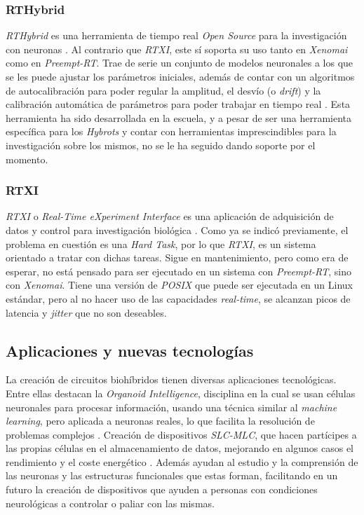 \subsubsection{RTHybrid\label{SSS:RTHYBRID}}


\textit{RTHybrid} es una herramienta de tiempo real \textit{Open Source} para la investigación con neuronas \cite{Amaducci2019}. Al contrario que \textit{RTXI}, este sí soporta su uso tanto en \textit{Xenomai} como en \textit{Preempt-RT}. Trae de serie un conjunto de modelos neuronales a los que se les puede ajustar los parámetros iniciales, además de contar con un algoritmos de autocalibración para poder regular la amplitud, el desvío (o \textit{drift}) y la calibración automática de parámetros para poder trabajar en tiempo real \cite{ReyesSnchez2023}. Esta herramienta ha sido desarrollada en la escuela, y a pesar de ser una herramienta específica para los \textit{Hybrots} y contar con herramientas imprescindibles para la investigación sobre los mismos, no se le ha seguido dando soporte por el momento.


\subsubsection{RTXI\label{SSS:RTXI}}


\textit{RTXI} o \textit{Real-Time eXperiment Interface} es una aplicación de adquisición de datos y control para investigación biológica \cite{RTXIOrg2025}. Como ya se indicó previamente, el problema en cuestión es una \textit{Hard Task}, por lo que \textit{RTXI}, es un sistema orientado a tratar con dichas tareas. Sigue en mantenimiento, pero como era de esperar, no está pensado para ser ejecutado en un sistema con \textit{Preempt-RT}, sino con \textit{Xenomai}. Tiene una versión de \textit{POSIX} que puede ser ejecutada en un Linux estándar, pero al no hacer uso de las capacidades \textit{real-time}, se alcanzan picos de latencia y \textit{jitter} que no son deseables.


\subsection{Aplicaciones y nuevas tecnologías\label{SS:APPSYNUEVASTECH}}


La creación de circuitos biohíbridos tienen diversas aplicaciones tecnológicas. Entre ellas destacan la \textit{Organoid Intelligence}, disciplina en la cual se usan células neuronales para procesar información, usando una técnica similar al \textit{machine learning}, pero aplicada a neuronas reales, lo que facilita la resolución de problemas complejos \cite{Smirnova2023}. Creación de dispositivos \textit{SLC-MLC}, que hacen partícipes a las propias células en el almacenamiento de datos, mejorando en algunos casos el rendimiento y el coste energético \cite{Murugan2012}. Además ayudan al estudio y la comprensión de las neuronas y las estructuras funcionales que estas forman, facilitando en un futuro la creación de dispositivos que ayuden a personas con condiciones neurológicas a controlar o paliar con las mismas.


